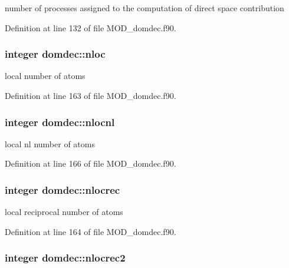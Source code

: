 number of processes assigned to the computation of direct space contribution 



Definition at line 132 of file M\-O\-D\-\_\-domdec.\-f90.

\hypertarget{classdomdec_a9ce080b6f61843bfcf7f9a11a90a7ba5}{
\subsubsection[{nloc}]{\setlength{\rightskip}{0pt plus 5cm}integer domdec\-::nloc}}\label{classdomdec_a9ce080b6f61843bfcf7f9a11a90a7ba5}


local number of atoms 



Definition at line 163 of file M\-O\-D\-\_\-domdec.\-f90.

\hypertarget{classdomdec_a7b54734f2525070176f359438cc508fa}{
\subsubsection[{nlocnl}]{\setlength{\rightskip}{0pt plus 5cm}integer domdec\-::nlocnl}}\label{classdomdec_a7b54734f2525070176f359438cc508fa}


local nl number of atoms 



Definition at line 166 of file M\-O\-D\-\_\-domdec.\-f90.

\hypertarget{classdomdec_a15d118ab39f277c8787003cda8a222d2}{
\subsubsection[{nlocrec}]{\setlength{\rightskip}{0pt plus 5cm}integer domdec\-::nlocrec}}\label{classdomdec_a15d118ab39f277c8787003cda8a222d2}


local reciprocal number of atoms 



Definition at line 164 of file M\-O\-D\-\_\-domdec.\-f90.

\hypertarget{classdomdec_a611d883dfaae5395b468ac03b000e572}{
\subsubsection[{nlocrec2}]{\setlength{\rightskip}{0pt plus 5cm}integer domdec\-::nlocrec2}}\label{classdomdec_a611d883dfaae5395b468ac03b000e572}


